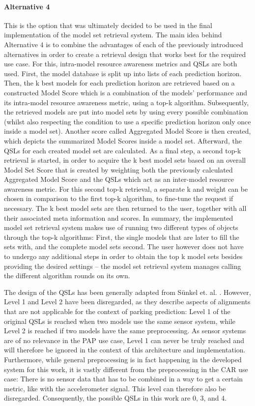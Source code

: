 \paragraph{Alternative 4}
This is the option that was ultimately decided to be used in the final implementation of the model set retrieval system. The main idea behind Alternative 4 is to combine the advantages of each of the previously introduced alternatives in order to create a retrieval design that works best for the required use case. For this, intra-model resource awareness metrics and QSLs are both used. First, the model database is split up into lists of each prediction horizon. Then, the k best models for each prediction horizon are retrieved based on a constructed Model Score which is a combination of the models’ performance and its intra-model resource awareness metric, using a top-k algorithm. Subsequently, the retrieved models are put into model sets by using every possible combination (whilst also respecting the condition to use a specific prediction horizon only once inside a model set). Another score called Aggregated Model Score is then created, which depicts the summarized Model Scores inside a model set. Afterward, the QSLs for each created model set are calculated. As a final step, a second top-k retrieval is started, in order to acquire the k best model sets based on an overall Model Set Score that is created by weighting both the previously calculated Aggregated Model Score and the QSLs which act as an inter-model resource awareness metric. For this second top-k retrieval, a separate k and weight can be chosen in comparison to the first top-k algorithm, to fine-tune the request if necessary. The k best model sets are then returned to the user, together with all their associated meta information and scores. In summary, the implemented model set retrieval system makes use of running two different types of objects through the top-k algorithms: First, the single models that are later to fill the sets with, and the complete model sets second. The user however does not have to undergo any additional steps in order to obtain the top k model sets besides providing the desired settings – the model set retrieval system manages calling the different algorithm rounds on its own.

The design of the QSLs has been generally adapted from Sünkel et. al. \cite{sunkel2022}. However, Level 1 and Level 2 have been disregarded, as they describe aspects of alignments that are not applicable for the context of parking prediction: Level 1 of the original QSLs is reached when two models use the same sensor system, while Level 2 is reached if two models have the same preprocessing. As sensor systems are of no relevance in the PAP use case, Level 1 can never be truly reached and will therefore be ignored in the context of this architecture and implementation. Furthermore, while general preprocessing is in fact happening in the developed system for this work, it is vastly different from the preprocessing in the CAR use case: There is no sensor data that has to be combined in a way to get a certain metric, like with the accelerometer signal. This level can therefore also be disregarded. Consequently, the possible QSLs in this work are 0, 3, and 4.

